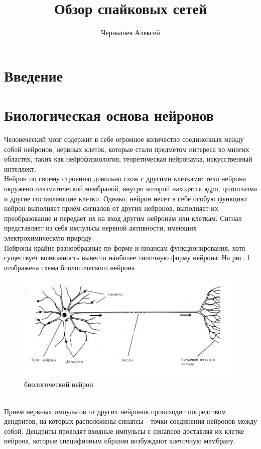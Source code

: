 \documentclass[a4paper,10pt]{article}
\title{Обзор спайковых сетей}
\author{Чернышев Алексей}
\begin{document}


\tableofcontents
\clearpage
\section{Введение}

\section{Биологическая основа нейронов}
\indent Человеческий мозг содержит в себе огромное количество соединенных между собой нейронов, нервных клеток, которые стали предметом интереса во многих областях, таких как нейрофизиология, теоретическая нейронаука, искусственный интеллект.\\
\indent Нейрон по своему строению довольно схож с другими клетками: тело нейрона окружено плазматической мембраной, внутри которой находятся ядро, цитоплазма и другие составляющие клетки. Однако, нейрон несет в себе особую функцию: нейрон выполняет приём сигналов от других нейронов, выполняет их преобразование и передает их на вход другим нейронам или клеткам. Сигнал представляет из себя импульсы нервной активности, имеющих электрохимическую природу\\
\indent Нейроны крайне разнообразные по форме и нюансам функционирования, хотя существует возможность вывести наиболее типичную форму нейрона. На рис. \ref{bio_pic} отображена схема биологического нейрона. \\
\begin{figure}[ht]
\centering
\includegraphics[width=1\linewidth]{bio_neuron.jpg}
\caption{биологический нейрон}
\label{bio_pic}
\end{figure} \\
\indent Прием нервных импульсов от других нейронов происходит посредством дендритов, на которых расположены синапсы - точки соединения нейронов между собой. Дендриты проводят входные импульсы с синапсов доставляя их клетке нейрона, которые специфичным образом возбуждают клеточную мембрану.\\
\end{document}
